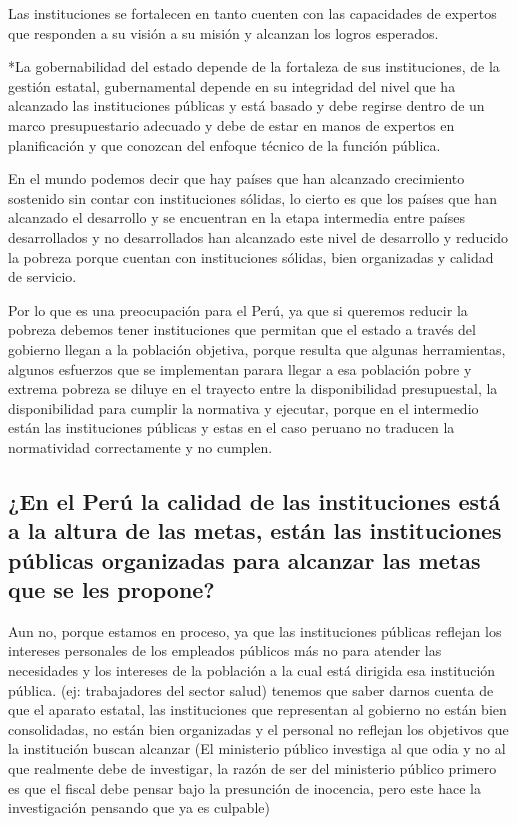 \documentclass[
  a4paper,
]{article}
\begin{document}
Las instituciones se fortalecen en tanto cuenten con las capacidades de
expertos que responden a su visión a su misión y alcanzan los logros
esperados.

*La gobernabilidad del estado depende de la fortaleza de sus
instituciones, de la gestión estatal, gubernamental depende en su
integridad del nivel que ha alcanzado las instituciones públicas y está
basado y debe regirse dentro de un marco presupuestario adecuado y debe
de estar en manos de expertos en planificación y que conozcan del
enfoque técnico de la función pública.

En el mundo podemos decir que hay países que han alcanzado crecimiento
sostenido sin contar con instituciones sólidas, lo cierto es que los
países que han alcanzado el desarrollo y se encuentran en la etapa
intermedia entre países desarrollados y no desarrollados han alcanzado
este nivel de desarrollo y reducido la pobreza porque cuentan con
instituciones sólidas, bien organizadas y calidad de servicio.

Por lo que es una preocupación para el Perú, ya que si queremos reducir
la pobreza debemos tener instituciones que permitan que el estado a
través del gobierno llegan a la población objetiva, porque resulta que
algunas herramientas, algunos esfuerzos que se implementan parara llegar
a esa población pobre y extrema pobreza se diluye en el trayecto entre
la disponibilidad presupuestal, la disponibilidad para cumplir la
normativa y ejecutar, porque en el intermedio están las instituciones
públicas y estas en el caso peruano no traducen la normatividad
correctamente y no cumplen.

\hypertarget{en-el-peruxfa-la-calidad-de-las-instituciones-estuxe1-a-la-altura-de-las-metas-estuxe1n-las-instituciones-puxfablicas-organizadas-para-alcanzar-las-metas-que-se-les-propone}{%
\subsection{¿En el Perú la calidad de las instituciones está a la altura
de las metas, están las instituciones públicas organizadas para alcanzar
las metas que se les
propone?}\label{en-el-peruxfa-la-calidad-de-las-instituciones-estuxe1-a-la-altura-de-las-metas-estuxe1n-las-instituciones-puxfablicas-organizadas-para-alcanzar-las-metas-que-se-les-propone}}

Aun no, porque estamos en proceso, ya que las instituciones públicas
reflejan los intereses personales de los empleados públicos más no para
atender las necesidades y los intereses de la población a la cual está
dirigida esa institución pública. (ej: trabajadores del sector salud)
tenemos que saber darnos cuenta de que el aparato estatal, las
instituciones que representan al gobierno no están bien consolidadas, no
están bien organizadas y el personal no reflejan los objetivos que la
institución buscan alcanzar (El ministerio público investiga al que odia
y no al que realmente debe de investigar, la razón de ser del ministerio
público primero es que el fiscal debe pensar bajo la presunción de
inocencia, pero este hace la investigación pensando que ya es culpable)
\end{document}
